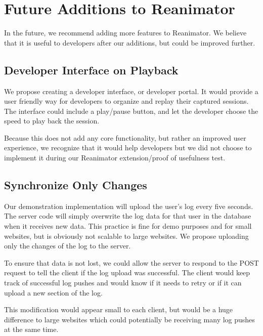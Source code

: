 \documentclass[12pt,journal]{IEEEtran}
\begin{document}
\section{Future Additions to Reanimator}
In the future, we recommend adding more features to Reanimator. We believe that it is useful to developers after our additions, but could be improved further.

\subsection{Developer Interface on Playback}
We propose creating a developer interface, or developer portal. It would provide a user friendly way for developers to organize and replay their captured sessions. The interface could include a play/pause button, and let the developer choose the speed to play back the session.
\par
Because this does not add any core functionality, but rather an improved user experience, we recognize that it would help developers but we did not choose to implement it during our Reanimator extension/proof of usefulness test.

\subsection{Synchronize Only Changes}
Our demonstration implementation will upload the user's log every five seconds. The server code will simply overwrite the log data for that user in the database when it receives new data. This practice is fine for demo purposes and for small websites, but is obviously not scalable to large websites. We propose uploading only the changes of the log to the server.
\par
To ensure that data is not lost, we could allow the server to respond to the POST request to tell the client if the log upload was successful. The client would keep track of successful log pushes and would know if it needs to retry or if it can upload a new section of the log.
\par
This modification would appear small to each client, but would be a huge difference to large websites which could potentially be receiving many log pushes at the same time.
\end{document}
